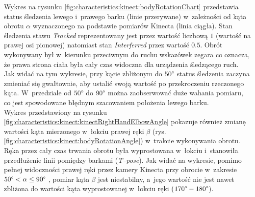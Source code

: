 Wykres na rysunku \ref{fig:characteristics:kinect:bodyRotationChart} przedstawia status śledzenia lewego i~prawego barku (linie przerywane) w~zależności od kąta obrotu $\alpha$ wyznaczonego na podstawie pomiarów Kinecta (linia ciągła). Stan śledzenia stawu \emph{Tracked} reprezentowany jest przez wartość liczbową $1$ (wartość na prawej osi pionowej) natomiast stan \emph{Interferred} przez wartość $0.5$. Obrót wykonywany był w~kierunku przeciwnym do ruchu wskazówek zegara co oznacza, że prawa strona ciała była cały czas widoczna dla urządzenia śledzącego ruch. Jak widać na tym wykresie, przy kącie zbliżonym do $50\degree$ status śledzenia zaczyna zmieniać się gwałtownie, aby ustalić swoją wartość po przekroczeniu rzeczonego kąta. W~przedziale od $50\degree$ do $90\degree$ można zaobserwować duże wahania pomiaru, co jest spowodowane błędnym szacowaniem położenia lewego barku.\\ 
Wykres przedstawiony na rysunku \ref{fig:characteristics:kinect:kinectRightHandElbowAngle} pokazuje również zmianę wartości kąta mierzonego w~łokciu prawej ręki $\beta$ (rys. \ref{fig:characteristics:kinect:bodyRotationAngle}) w~trakcie wykonywania obrotu. Ręka przez cały czas trwania obrotu była wyprostowana w~łokciu i~stanowiła przedłużenie linii pomiędzy barkami (\emph{T--pose}). Jak widać na wykresie, pomimo pełnej widoczności prawej ręki przez kamery Kinecta przy obrocie w~zakresie  $50\degree < \alpha \le 90\degree$ , pomiar kąta $\beta$ jest niestabilny, a~jego wartość nie jest nawet zbliżona do wartości kąta wyprostowanej w~łokciu ręki ($170\degree-180\degree$). 
		
